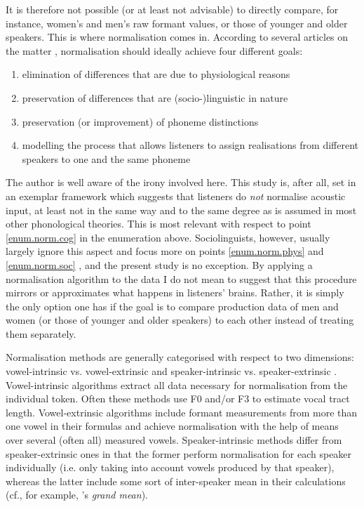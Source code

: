 It is therefore not possible (or at least not advisable) to directly compare, for instance, women's and men's raw formant values, or those of younger and older speakers.
This is where normalisation comes in.
According to several articles on the matter \parencite[cf., for example,][]{fabriciusetal2009,clopper2009,disner1980,kendallthomas2014,thomas2002}, normalisation should ideally achieve four different goals:
\begin{enumerate}
	\item \label{enum.norm.phys}elimination of differences that are due to physiological reasons
	\item \label{enum.norm.soc}preservation of differences that are (socio-)linguistic in nature
	\item \label{enum.norm.phon}preservation (or improvement) of phoneme distinctions
	\item \label{enum.norm.cog}modelling the process that allows listeners to assign realisations from different speakers to one and the same phoneme
\end{enumerate}
The author is well aware of the irony involved here.
This study is, after all, set in an exemplar framework which suggests that listeners do \emph{not} normalise acoustic input, at least not in the same way and to the same degree as is assumed in most other phonological theories.
This is most relevant with respect to point \ref{enum.norm.cog} in the enumeration above. Sociolinguists, however, usually largely ignore this aspect and focus more on points \ref{enum.norm.phys} and \ref{enum.norm.soc} \parencites(cf.)()[1430]{clopper2009}[414--415]{fabriciusetal2009}{kendallthomas2014}, and the present study is no exception.
By applying a normalisation algorithm to the data I do not mean to suggest that this procedure mirrors or approximates what happens in listeners' brains.
Rather, it is simply the only option one has if the goal is to compare production data of men and women (or those of younger and older speakers) to each other instead of treating them separately.

Normalisation methods are generally categorised with respect to two dimensions: vowel-intrinsic vs. vowel-extrinsic and speaker-intrinsic vs. speaker-extrinsic \parencite[cf.][]{kendallthomas2014}.
Vowel-intrinsic algorithms extract all data necessary for normalisation from the individual token.
Often these methods use F0 and/or F3 to estimate vocal tract length.
Vowel-extrinsic algorithms include formant measurements from more than one vowel in their formulas and achieve normalisation with the help of means over several (often all) measured vowels.
Speaker-intrinsic methods differ from speaker-extrinsic ones in that the former perform normalisation for each speaker individually (i.e. only taking into account vowels produced by that speaker), whereas the latter include some sort of inter-speaker mean in their calculations (cf., for example, \textcite{labovetal2006}'s \emph{grand mean}).

